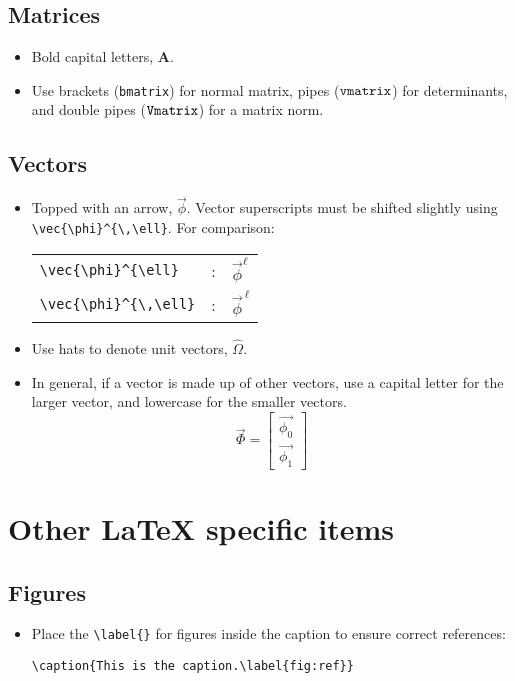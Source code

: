 \documentclass[10pt, letter]{article}
\begin{document}
\begin{multicols}{2}
\subsection{Matrices}
\begin{itemize}
\item Bold capital letters, $\mathbf{A}$.
\item Use brackets (\verb|bmatrix|) for normal matrix, pipes
  ($\verb|vmatrix|$) for
  determinants, and double pipes ($\verb|Vmatrix|$) for a matrix norm.
\end{itemize}

\subsection{Vectors}
\begin{itemize}
\item Topped with an arrow, $\vec{\phi}$. Vector superscripts must be shifted
slightly using \verb|\vec{\phi}^{\,\ell}|. For comparison:
\begin{center}
  \begin{tabular}[h!]{lcl}
    \verb|\vec{\phi}^{\ell}| & : & $\vec{\phi}^{\ell}$ \\
    \verb|\vec{\phi}^{\,\ell}| & : & $\vec{\phi}^{\,\ell}$
  \end{tabular}
\end{center}
\item Use hats to denote unit vectors, $\hat{\Omega}$.
\item In general, if a vector is made up of other vectors, use a
  capital letter for the larger vector, and lowercase for the smaller
  vectors.
\begin{equation*}
    \vec{\Phi} =
    \begin{bmatrix}
      \vec{\phi_0} \\ \vec{\phi_1}
    \end{bmatrix}
\end{equation*}
\end{itemize}
\end{multicols}
\pagebreak

\section{Other \LaTeX{} specific items}\label{sec:latex}

\subsection{Figures}\label{sec:figures}
\begin{itemize}
\item Place the \verb|\label{}| for figures inside the caption to ensure
  correct references:
\begin{lstlisting}
\caption{This is the caption.\label{fig:ref}}
\end{lstlisting}
\end{itemize}
\end{document}
